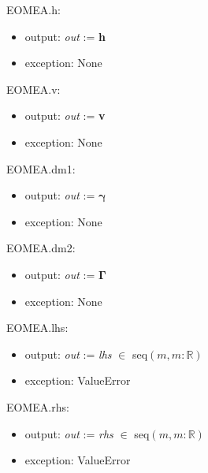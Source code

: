 \documentclass[12pt, titlepage]{article}
\begin{document}
\noindent EOMEA.h:
\begin{itemize}
	\item output: \textit{out} := \textbf{h}
	\item exception: None
\end{itemize}

\noindent EOMEA.v:
\begin{itemize}
	\item output: \textit{out} := \textbf{v}
	\item exception: None
\end{itemize}

\noindent EOMEA.dm1:
\begin{itemize}
	\item output: \textit{out} := $\boldsymbol{\gamma}$
	\item exception: None
\end{itemize}

\noindent EOMEA.dm2:
\begin{itemize}
	\item output: \textit{out} := $\boldsymbol{\Gamma}$
	\item exception: None
\end{itemize}

\noindent EOMEA.lhs:
\begin{itemize}
	\item output: \textit{out} := \textit{lhs} $\in$ seq$(m,m:\mathbb{R})$
	\item exception: ValueError
\end{itemize}

\noindent EOMEA.rhs:
\begin{itemize}
	\item output: \textit{out} := \textit{rhs} $\in$ seq$(m,m:\mathbb{R})$
	\item exception: ValueError
\end{itemize}

%
\end{document}
